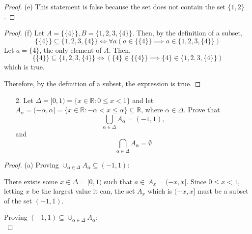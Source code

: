 \documentclass[10pt]{article}
\theoremstyle{definition}
\theoremstyle{plain}
\newcommand{\R}{\mathbb{R}}
\begin{document}
\begin{proof}{(e)}
  This statement is false because the set does not contain the set $\{1,2\}$.
\end{proof}

\begin{proof}{(f)}
  Let $A=\{\{4\}\}, B = \{1,2,3,\{4\}\}$. Then, by the definition of a subset,
  \begin{equation*}
    \{\{4\}\} \subseteq \{1,2,3,\{4\}\} \iff \forall a(a\in \{\{4\}\} \implies a\in \{1,2,3,\{4\}\})
  \end{equation*}
  Let $a=\{4\}$, the only element of $A$. Then,
  \begin{equation*}
      \{\{4\}\} \subseteq \{1,2,3,\{4\}\} \iff (\{4\}\in \{\{4\}\} \implies \{4\}\in \{1,2,3,\{4\}\})
  \end{equation*}
  which is true. \\

  \par Therefore, by the definition of a subset, the expression is true.
\end{proof}



\pagebreak



\begin{enumerate}
  \item[2.] Let $\Delta = [0,1) = \{x \in \R: 0 \leq x < 1\}$ and let $A_\alpha = (-\alpha,\alpha] = \{x \in \R: -\alpha < x \leq \alpha\} \subseteq \R$, where $\alpha \in \Delta$.  Prove that
      $$\bigcup_{\alpha \in \Delta} A_\alpha = (-1,1),$$
   and
      $$\bigcap_{\alpha \in \Delta} A_\alpha = \emptyset$$
\end{enumerate}

\begin{proof}{(a)}
  Proving $\cup_{\alpha \in \Delta} A_\alpha \subseteq (-1,1)$: \\

  \par There exists some $x\in\Delta = [0,1)$ such that $a\in\ A_x=(-x,x]$. Since $0 \leq x<1$, letting $x$ be the largest value it can, the set $A_x$ which is $(-x,x]$ must be a subset of the set $(-1,1)$. \\

  \par Proving $(-1,1) \subseteq \cup_{\alpha \in \Delta} A_\alpha$: \\

  \par
\end{proof}
\end{document}
